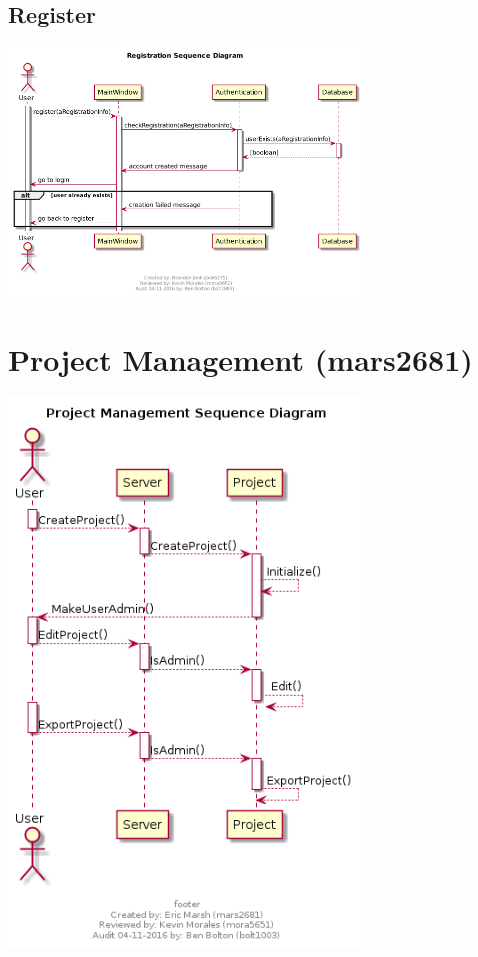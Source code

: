 \documentclass[11pt]{report}
\begin{document}
    \subsection{Register}
        \begin{minipage}{1\textwidth}
            \begin{center}
                \includegraphics[width=0.7\textwidth]{diagrams/sequence-authentication-register}
            \end{center}
        \end{minipage}
    
\section{Project Management (mars2681)}
    \begin{minipage}{1\textwidth}
        \begin{center}
            \includegraphics[width=0.7\textwidth]{diagrams/sequence-projectmanagement}
        \end{center}
    \end{minipage}
    
\end{document}
